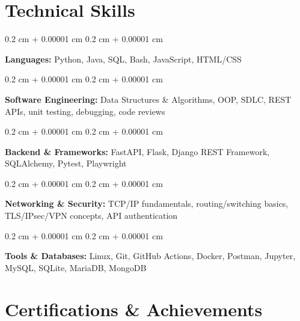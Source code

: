 \documentclass[10pt, letterpaper]{article}
\newenvironment{onecolentry}{
    \begin{adjustwidth}{
        0.2 cm + 0.00001 cm
    }{
        0.2 cm + 0.00001 cm
    }
}{
    \end{adjustwidth}
} %
\begin{document}
    \section{Technical Skills}

        \begin{onecolentry}
            \textbf{Languages:} Python, Java, SQL, Bash, JavaScript, HTML/CSS
        \end{onecolentry}

        \vspace{0.06 cm}

        \begin{onecolentry}
            \textbf{Software Engineering:} Data Structures \& Algorithms, OOP, SDLC, REST APIs, unit testing, debugging, code reviews
        \end{onecolentry}

        \vspace{0.06 cm}

        \begin{onecolentry}
            \textbf{Backend \& Frameworks:} FastAPI, Flask, Django REST Framework, SQLAlchemy, Pytest, Playwright
        \end{onecolentry}

        \vspace{0.06 cm}

        \begin{onecolentry}
            \textbf{Networking \& Security:} TCP/IP fundamentals, routing/switching basics, TLS/IPsec/VPN concepts, API authentication
        \end{onecolentry}

        \vspace{0.06 cm}

        \begin{onecolentry}
            \textbf{Tools \& Databases:} Linux, Git, GitHub Actions, Docker, Postman, Jupyter, MySQL, SQLite, MariaDB, MongoDB
        \end{onecolentry}


    \section{Certifications \& Achievements}
\end{document}
